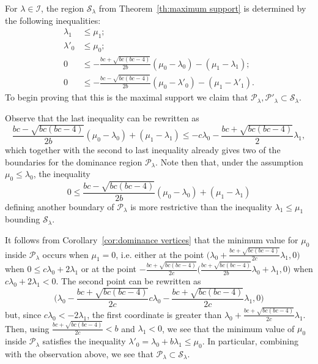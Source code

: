 \documentclass{amsart}
\numberwithin{theorem}{section}
\newcommand{\cI}{\mathcal{I}}
\newcommand{\cP}{\mathcal{P}}
\newcommand{\cS}{\mathcal{S}}
\begin{document}
  For $\lambda\in\cI$, the region $\cS_\lambda$ from Theorem~\ref{th:maximum support} is determined by the following inequalities:
  \begin{align*}
    \lambda_1 &\leq \mu_1;\\
    \lambda'_0 &\leq \mu_0;\\
    0 &\leq -\frac{b c+\sqrt{b c (b c-4)}}{2 b}(\mu_0-\lambda_0)-(\mu_1-\lambda_1);\\
    0 &\leq -\frac{b c-\sqrt{b c (b c-4)}}{2 b}(\mu_0-\lambda'_0) -(\mu_1-\lambda'_1).
  \end{align*}
  To begin proving that this is the maximal support we claim that $\cP_\lambda,\cP'_\lambda\subset\cS_\lambda$.

  Observe that the last inequality can be rewritten as
  \[ \frac{b c-\sqrt{b c (b c-4)}}{2 b}(\mu_0-\lambda_0) + (\mu_1-\lambda_1) \leq -c\lambda_0 - \frac{b c + \sqrt{b c (b c-4)}}{2 } \lambda_1,\]
  which together with the second to last inequality already gives two of the boundaries for the dominance region $\cP_\lambda$.
  Note then that, under the assumption $\mu_0\leq\lambda_0$, the inequality 
  \[0 \leq \frac{b c-\sqrt{b c (b c-4)}}{2 b}(\mu_0-\lambda_0)+(\mu_1-\lambda_1)\]
  defining another boundary of $\cP_\lambda$ is more restrictive than the inequality $\lambda_1\leq\mu_1$ bounding $\cS_\lambda$.

  It follows from Corollary~\ref{cor:dominance vertices} that the minimum value for $\mu_0$ inside $\cP_\lambda$ occurs when $\mu_1=0$, i.e. either at the point $\big( \lambda_0+\frac{bc+\sqrt{bc(bc-4)}}{2c}\lambda_1 , 0 \big)$ when $0 \leq c\lambda_0+2\lambda_1$ or at the point $-\frac{bc+\sqrt{bc(bc-4)}}{2c} \big( \frac{bc+\sqrt{bc(bc-4)}}{2b}\lambda_0+\lambda_1 , 0 \big)$ when $c\lambda_0+2\lambda_1<0$.
  The second point can be rewritten as
  \[\big(\lambda_0 -\frac{bc+\sqrt{bc(bc-4)}}{2c} c\lambda_0-\frac{bc+\sqrt{bc(bc-4)}}{2c} \lambda_1 , 0 \big)\]
  but, since $c\lambda_0 < -2\lambda_1$, the first coordinate is greater than $\lambda_0+\frac{bc+\sqrt{bc(bc-4)}}{2c}\lambda_1$.
  Then, using $\frac{bc+\sqrt{bc(bc-4)}}{2c}<b$ and $\lambda_1<0$, we see that the minimum value of $\mu_0$ inside $\cP_\lambda$ satisfies the inequality $\lambda'_0=\lambda_0+b\lambda_1 \leq \mu_0$.
  In particular, combining with the observation above, we see that $\cP_\lambda\subset\cS_\lambda$.
\end{document}
